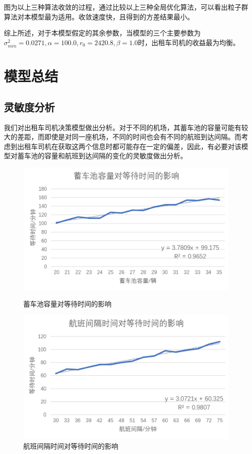 \documentclass{cumcm}
\begin{document}
\par
图为以上三种算法收敛的过程，通过比较以上三种全局优化算法，可以看出粒子群算法对本模型最为适用。收敛速度快，且得到的方差结果最小。\par
综上所述，对于本模型假定的其余参数，当模型的三个主要参数为$\sigma_{min}^2=0.0271,\alpha=100.0,r_0=2420.8,\beta=1.0$时，出租车司机的收益最为均衡。
\section{模型总结}
\subsection{灵敏度分析}
我们对出租车司机决策模型做出分析。对于不同的机场，其蓄车池的容量可能有较大的差距，而即使是对同一座机场，不同的时间也会有不同的航班到达间隔。而考虑到出租车司机在获取这两个信息时都可能存在一定的偏差，因此，有必要对该模型对蓄车池的容量和航班到达间隔的变化的灵敏度做出分析。\par
\begin{figure}[H]
	\begin{minipage}[t]{0.5\linewidth}   
	  \centering   
	  \includegraphics[width=\textwidth]{img/check_1.jpg}   
	  \caption{蓄车池容量对等待时间的影响}   
	  \label{fi:check_1}   
	\end{minipage}
	 \begin{minipage}[t]{0.5\linewidth}
		\centering   
		\includegraphics[width=\textwidth]{img/check_2.jpg}   
		\caption{航班间隔时间对等待时间的影响}   
		\label{fi:check_2}   
	  \end{minipage} 
  \end{figure}
\end{document}
